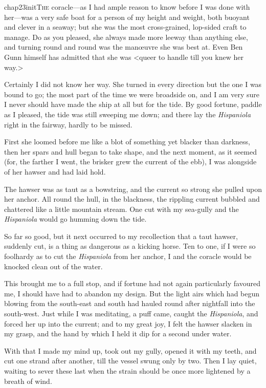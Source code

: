 
\lettrine{chap23initT}{he} coracle—as I had ample reason to know before I was done with her—was a very safe boat for a person of my height and weight, both buoyant and clever in a seaway; but she was the most cross-grained, lop-sided craft to manage. Do as you pleased, she always made more leeway than anything else, and turning round and round was the manœuvre she was best at. Even Ben Gunn himself has admitted that she was <queer to handle till you knew her way.>

Certainly I did not know her way. She turned in every direction but the one I was bound to go; the most part of the time we were broadside on, and I am very sure I never should have made the ship at all but for the tide. By good fortune, paddle as I pleased, the tide was still sweeping me down; and there lay the \textit{Hispaniola} right in the fairway, hardly to be missed.

First she loomed before me like a blot of something yet blacker than darkness, then her spars and hull began to take shape, and the next moment, as it seemed (for, the farther I went, the brisker grew the current of the ebb), I was alongside of her hawser and had laid hold.

The hawser was as taut as a bowstring, and the current so strong she pulled upon her anchor. All round the hull, in the blackness, the rippling current bubbled and chattered like a little mountain stream. One cut with my sea-gully and the \textit{Hispaniola} would go humming down the tide.

So far so good, but it next occurred to my recollection that a taut hawser, suddenly cut, is a thing as dangerous as a kicking horse. Ten to one, if I were so foolhardy as to cut the \textit{Hispaniola} from her anchor, I and the coracle would be knocked clean out of the water.

This brought me to a full stop, and if fortune had not again particularly favoured me, I should have had to abandon my design. But the light airs which had begun blowing from the south-east and south had hauled round after nightfall into the south-west. Just while I was meditating, a puff came, caught the \textit{Hispaniola}, and forced her up into the current; and to my great joy, I felt the hawser slacken in my grasp, and the hand by which I held it dip for a second under water.

With that I made my mind up, took out my gully, opened it with my teeth, and cut one strand after another, till the vessel swung only by two. Then I lay quiet, waiting to sever these last when the strain should be once more lightened by a breath of wind.

